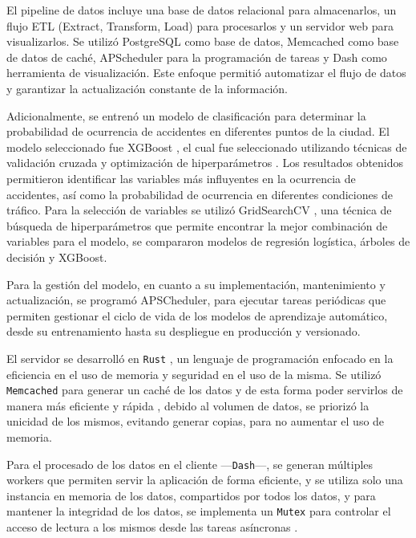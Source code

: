 \documentclass[12pt]{article}
\begin{document}
El pipeline de datos incluye una base de datos relacional para almacenarlos, un flujo ETL (Extract, Transform, Load) para procesarlos y un servidor web para visualizarlos. Se utilizó PostgreSQL \citep{postgres2025} como base de datos, Memcached  \citep{memcached2025} como base de datos de caché, APScheduler para la programación de tareas y Dash \citep{dash2025} como herramienta de visualización. Este enfoque permitió automatizar el flujo de datos y garantizar la actualización constante de la información.

Adicionalmente, se entrenó un modelo de clasificación para determinar la probabilidad de ocurrencia de accidentes en diferentes puntos de la ciudad. El modelo seleccionado fue XGBoost \citep{chen2016xgboost}, el cual fue seleccionado utilizando técnicas de validación cruzada y optimización de hiperparámetros \citep{geron2019hands}. Los resultados obtenidos permitieron identificar las variables más influyentes en la ocurrencia de accidentes, así como la probabilidad de ocurrencia en diferentes condiciones de tráfico. Para la selección de variables se utilizó GridSearchCV \citep{pedregosa2011scikit, geron2019hands}, una técnica de búsqueda de hiperparámetros que permite encontrar la mejor combinación de variables para el modelo, se compararon modelos de regresión logística, árboles de decisión y XGBoost.

Para la gestión del modelo, en cuanto a su implementación, mantenimiento y actualización, se programó APSCheduler, para ejecutar tareas periódicas que permiten gestionar el ciclo de vida de los modelos de aprendizaje automático, desde su entrenamiento hasta su despliegue en producción y versionado.

El servidor se desarrolló en \texttt{Rust} \citep{rust2025}, un lenguaje de programación enfocado en la eficiencia en el uso de memoria y seguridad en el uso de la misma. Se utilizó \texttt{Memcached} para generar un caché de los datos y de esta forma poder servirlos de manera más eficiente y rápida \citep{fitzpatrick2004memcached}, debido al volumen de datos, se priorizó la unicidad de los mismos, evitando generar copias, para no aumentar el uso de memoria.


Para el procesado de los datos en el cliente —\texttt{Dash}—, se generan múltiples workers que permiten servir la aplicación de forma eficiente, y se utiliza solo una instancia en memoria de los datos, compartidos por todos los datos, y para mantener la integridad de los datos, se implementa un \texttt{Mutex} para controlar el acceso de lectura a los mismos desde las tareas asíncronas \citep{ramalho2015fluent}.
\end{document}
